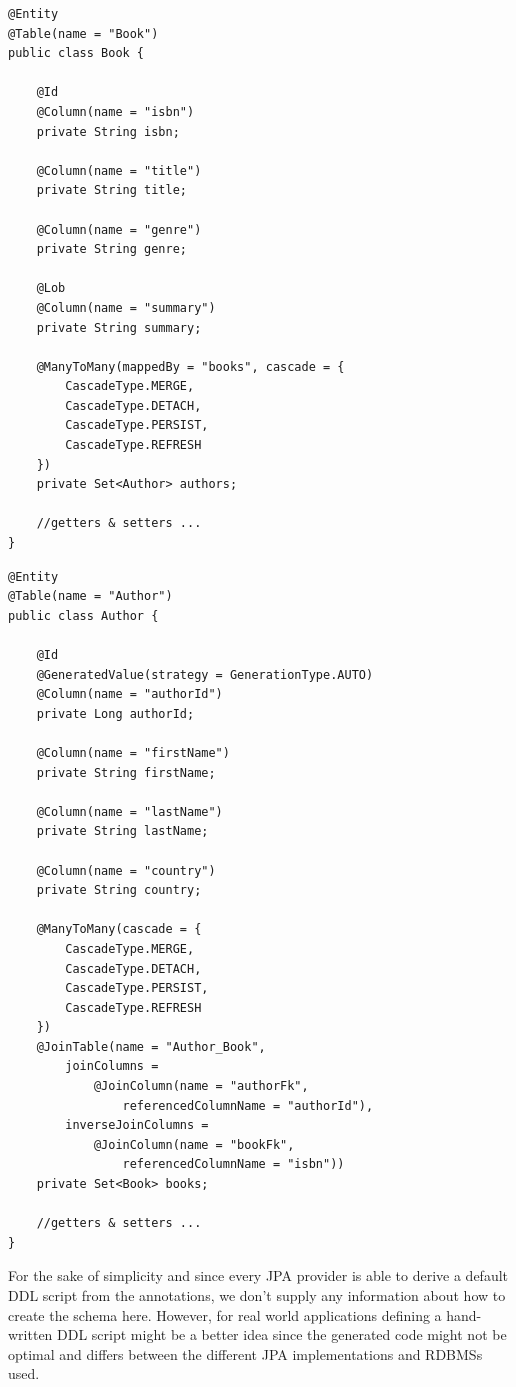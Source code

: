 \lstset{language=java}
\begin{lstlisting}[frame=htrbl, caption={Book.java}, label={lst:book.java_1}]
@Entity
@Table(name = "Book")
public class Book {

	@Id
	@Column(name = "isbn")
	private String isbn;
	
	@Column(name = "title")
	private String title;
	
	@Column(name = "genre")
	private String genre;
	
	@Lob
	@Column(name = "summary")
	private String summary;
	
	@ManyToMany(mappedBy = "books", cascade = {
		CascadeType.MERGE,
		CascadeType.DETACH,
		CascadeType.PERSIST,
		CascadeType.REFRESH
	})
	private Set<Author> authors;
	
	//getters & setters ...
}
\end{lstlisting}

\pagebreak

\lstset{language=java}
\begin{lstlisting}[frame=htrbl, caption={Author.java}, label={lst:author.java_1}]
@Entity
@Table(name = "Author")
public class Author {
	
	@Id
	@GeneratedValue(strategy = GenerationType.AUTO)
	@Column(name = "authorId")
	private Long authorId;
	
	@Column(name = "firstName")
	private String firstName;
	
	@Column(name = "lastName")
	private String lastName;
	
	@Column(name = "country")
	private String country;
	
	@ManyToMany(cascade = {
		CascadeType.MERGE, 
		CascadeType.DETACH, 
		CascadeType.PERSIST, 
		CascadeType.REFRESH
	})
	@JoinTable(name = "Author_Book", 
		joinColumns = 
			@JoinColumn(name = "authorFk", 
				referencedColumnName = "authorId"),
		inverseJoinColumns = 
			@JoinColumn(name = "bookFk", 
				referencedColumnName = "isbn"))
	private Set<Book> books;
	
	//getters & setters ...
}
\end{lstlisting}
For the sake of simplicity and since every JPA provider is able to derive a default DDL script from the annotations, we don't supply any information about how to create the schema here. However, for real world applications defining a hand-written DDL script might be a better idea since the generated code might not be optimal and differs between the different JPA implementations and RDBMSs used.

\pagebreak

